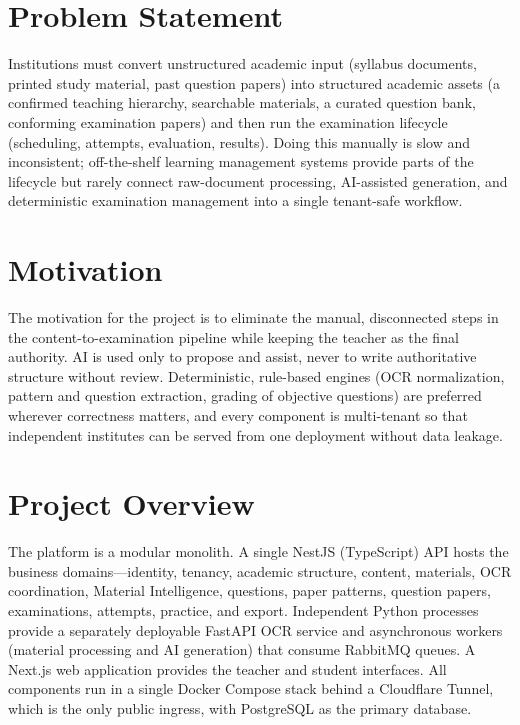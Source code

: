 \section{Problem Statement}

Institutions must convert unstructured academic input (syllabus documents,
printed study material, past question papers) into structured academic
assets (a confirmed teaching hierarchy, searchable materials, a curated
question bank, conforming examination papers) and then run the examination
lifecycle (scheduling, attempts, evaluation, results). Doing this manually
is slow and inconsistent; off-the-shelf learning management systems provide
parts of the lifecycle but rarely connect raw-document processing, AI-assisted
generation, and deterministic examination management into a single tenant-safe
workflow.

\section{Motivation}

The motivation for the project is to eliminate the manual, disconnected steps
in the content-to-examination pipeline while keeping the teacher as the final
authority. AI is used only to propose and assist, never to write authoritative
structure without review. Deterministic, rule-based engines (OCR
normalization, pattern and question extraction, grading of objective
questions) are preferred wherever correctness matters, and every component is
multi-tenant so that independent institutes can be served from one
deployment without data leakage.

\section{Project Overview}

The platform is a modular monolith. A single NestJS (TypeScript) API hosts the
business domains---identity, tenancy, academic structure, content, materials,
OCR coordination, Material Intelligence, questions, paper patterns, question
papers, examinations, attempts, practice, and export. Independent Python
processes provide a separately deployable FastAPI OCR service and asynchronous
workers (material processing and AI generation) that consume RabbitMQ queues.
A Next.js web application provides the teacher and student interfaces. All
components run in a single Docker Compose stack behind a Cloudflare Tunnel,
which is the only public ingress, with PostgreSQL as the primary database.

